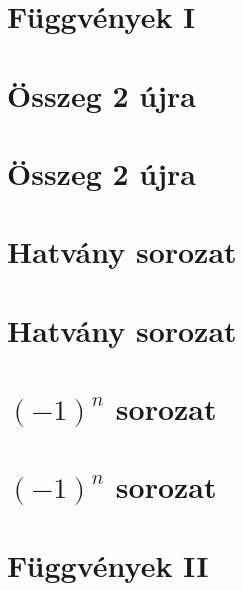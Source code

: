 \begin{spacing}{1.2}
\section*{Függvények I} \label{DBmatlabia11}
\Desc{

}
\vspace{0.5cm}
\newpage
\section*{Összeg 2 újra} \label{DBmatlabia12}
\Fa{

}
\vspace{0.5cm}
\newpage
\section*{Összeg 2 újra} \label{DBmatlabia12Mo}
\Mo{

}
\vspace{0.5cm}
\newpage
\section*{Hatvány sorozat} \label{DBmatlabia13}
\Fa{

}
\vspace{0.5cm}
\newpage
\section*{Hatvány sorozat} \label{DBmatlabia13Mo}
\Mo{

}
\vspace{0.5cm}
\newpage
\section*{$(-1)^n$ sorozat} \label{DBmatlabia14}
\Fa{

}
\vspace{0.5cm}
\newpage
\section*{$(-1)^n$ sorozat} \label{DBmatlabia14Mo}
\Mo{

}
\vspace{0.5cm}
\newpage
\section*{Függvények II} \label{DBmatlabia15}
\Desc{

}
\vspace{0.5cm}
\newpage

\end{spacing}



